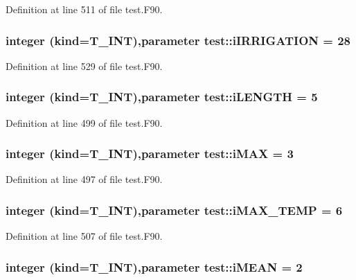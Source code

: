 Definition at line 511 of file test.F90.

\hypertarget{namespacetest_a5143d96a60fefdc2b8959e8e0b99661b}{
\subsubsection[{iIRRIGATION}]{\setlength{\rightskip}{0pt plus 5cm}integer (kind={\bf T\_\-INT}),parameter {\bf test::iIRRIGATION} = 28}}
\label{namespacetest_a5143d96a60fefdc2b8959e8e0b99661b}


Definition at line 529 of file test.F90.

\hypertarget{namespacetest_ab20904e5281139e17cfa93af209e2996}{
\subsubsection[{iLENGTH}]{\setlength{\rightskip}{0pt plus 5cm}integer (kind={\bf T\_\-INT}),parameter {\bf test::iLENGTH} = 5}}
\label{namespacetest_ab20904e5281139e17cfa93af209e2996}


Definition at line 499 of file test.F90.

\hypertarget{namespacetest_a15112155670f39cbf96fd72e177d71d3}{
\subsubsection[{iMAX}]{\setlength{\rightskip}{0pt plus 5cm}integer (kind={\bf T\_\-INT}),parameter {\bf test::iMAX} = 3}}
\label{namespacetest_a15112155670f39cbf96fd72e177d71d3}


Definition at line 497 of file test.F90.

\hypertarget{namespacetest_ad4e8b276391e3cbc8cc135dfa7b10971}{
\subsubsection[{iMAX\_\-TEMP}]{\setlength{\rightskip}{0pt plus 5cm}integer (kind={\bf T\_\-INT}),parameter {\bf test::iMAX\_\-TEMP} = 6}}
\label{namespacetest_ad4e8b276391e3cbc8cc135dfa7b10971}


Definition at line 507 of file test.F90.

\hypertarget{namespacetest_ad573fcda72b69e8d829aaecc8702e369}{
\subsubsection[{iMEAN}]{\setlength{\rightskip}{0pt plus 5cm}integer (kind={\bf T\_\-INT}),parameter {\bf test::iMEAN} = 2}}
\label{namespacetest_ad573fcda72b69e8d829aaecc8702e369}


